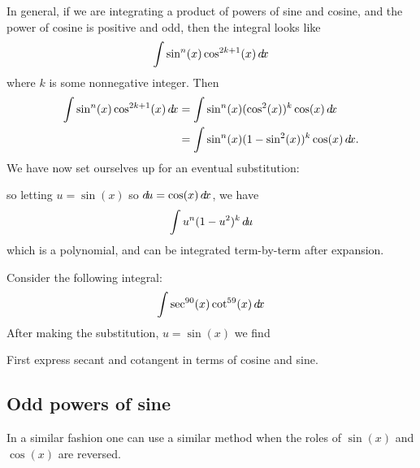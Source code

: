 \documentclass{ximera}
\begin{document}
In general, if we are integrating a product of powers of sine and cosine, and the power
of cosine is positive and odd, then the integral looks like
\[
\int \sin^n(x) \cos^{2k+1}(x) \mathop{}\!d\! x
\]
where $k$ is some nonnegative integer. Then
\begin{align*}
\int \sin^n(x) \cos^{2k+1}(x) \mathop{}\!d\! x &=\int \sin^n(x) (\cos^{2}(x))^k \cos(x)\mathop{}\!d\! x\\
&= \int \sin^n(x) (1-\sin^{2}(x))^k \cos(x) \mathop{}\!d\! x.
\end{align*}
We have now set ourselves up for an eventual substitution:
\begin{center}%
\end{center}
so letting $u = \sin(x)$ so $\mathop{}\!d\! u =\cos(x) \mathop{}\!d\! x$, we have 
\[
\int u^n(1-u^2)^k \mathop{}\!d\! u
\]
which is a polynomial, and can be integrated term-by-term after
expansion.

\begin{question}
  Consider the following integral:
  \[
  \int \sec^{90}(x) \cot^{59}(x)  \mathop{}\!d\! x
  \]
  After making the substitution, $u = \sin(x)$ we find
  \begin{hint}
    First express secant and cotangent in terms of cosine and sine.
  \end{hint}
  \begin{multipleChoice}
  \end{multipleChoice}
\end{question}


\subsection{Odd powers of sine}

In a similar fashion one can use a similar method when the roles of $\sin(x)$ and $\cos(x)$ are reversed. 
\end{document}

